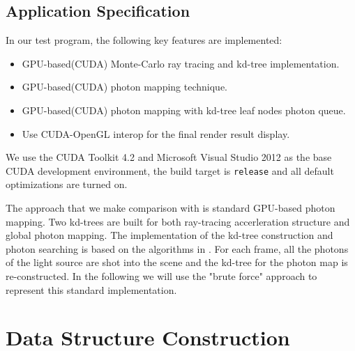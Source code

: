 \subsection{Application Specification}

In our test program, the following key features are implemented:

\begin{itemize}

\item{GPU-based(CUDA) Monte-Carlo ray tracing and kd-tree implementation.}

\item{GPU-based(CUDA) photon mapping technique. }

\item{GPU-based(CUDA) photon mapping with kd-tree leaf nodes photon queue.}

\item{Use CUDA-OpenGL interop for the final render result display. }

\end{itemize}

We use the CUDA Toolkit 4.2 and Microsoft Visual Studio 2012 as the base CUDA development environment, the build target is {\tt release} and all default optimizations are turned on.

The approach that we make comparison with is standard GPU-based photon mapping. Two kd-trees are built for both ray-tracing accerleration structure and global photon mapping. The implementation of the kd-tree construction and photon searching is based on the algorithms in \cite{Zhou2008}. For each frame, all the photons of the light source are shot into the scene and the kd-tree for the photon map is re-constructed. In the following we will use the "brute force" approach to represent this standard implementation. 


\section{Data Structure Construction}
\label{sec:build_time}

